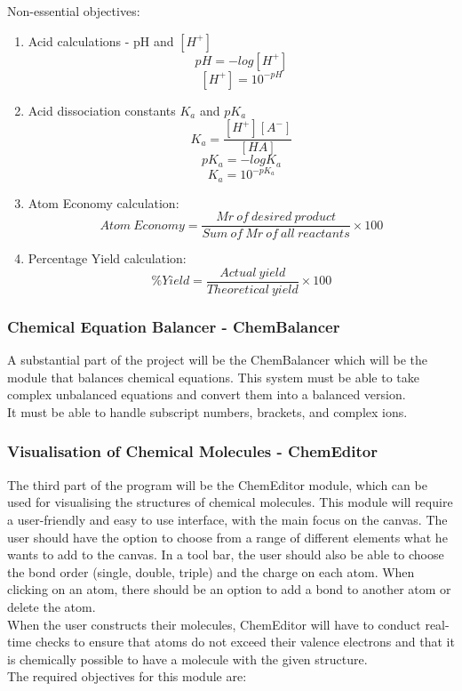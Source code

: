 \documentclass[a4paper,12pt]{article}
\begin{document}
\newpage

Non-essential objectives:
\begin{enumerate}
\item Acid calculations - pH and $[H^{+}]$
\[pH = -log[H^{+}]\]
\[[H^{+}] = 10^{-pH}\]

\item Acid dissociation constants $K_{a}$ and $pK_{a}$
\[K_{a} = \frac{[H^{+}][A^{-}]}{[HA]}\]
\[pK_{a} = -logK_{a}\]
\[K_{a} = 10^{-pK_{a}}\]

\item Atom Economy calculation:
\[Atom\: Economy = \frac{Mr\: of\: desired\: product}{Sum\: of\: Mr\: of\: all\: reactants}\times 100\]

\item Percentage Yield calculation:
\[\%Yield = \frac{Actual\: yield}{Theoretical\: yield} \times 100\]

\end{enumerate}

\newpage

\subsubsection{Chemical Equation Balancer - ChemBalancer}

A substantial part of the project will be the ChemBalancer which will be the module that balances chemical equations. This system must be able to take complex unbalanced equations and convert them into a balanced version.\\
It must be able to handle subscript numbers, brackets, and complex ions.

\subsubsection{Visualisation of Chemical Molecules - ChemEditor}

The third part of the program will be the ChemEditor module, which can be used for visualising the structures of chemical molecules. This module will require a user-friendly and easy to use interface, with the main focus on the canvas. The user should have the option to choose from a range of different elements what he wants to add to the canvas. In a tool bar, the user should also be able to choose the bond order (single, double, triple) and the charge on each atom. When clicking on an atom, there should be an option to add a bond to another atom or delete the atom.\\
When the user constructs their molecules, ChemEditor will have to conduct real-time checks to ensure that atoms do not exceed their valence electrons and that it is chemically possible to have a molecule with the given structure. \\
The required objectives for this module are:\\
\end{document}
